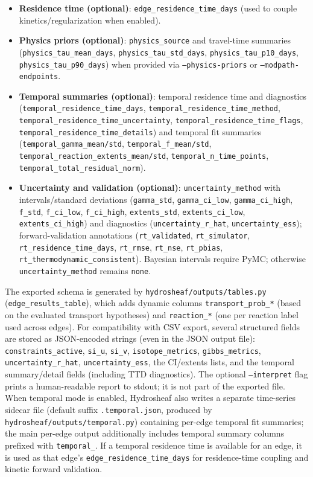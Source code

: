\documentclass[12pt,a4paper]{article}
\theoremstyle{plain}
\theoremstyle{definition}
\theoremstyle{remark}
\begin{document}
\begin{itemize}
	\item \textbf{Residence time (optional)}: \texttt{edge\_residence\_time\_days} (used to couple kinetics/regularization when enabled).
	\item \textbf{Physics priors (optional)}: \texttt{physics\_source} and travel-time summaries (\texttt{physics\_tau\_mean\_days}, \texttt{physics\_tau\_std\_days}, \texttt{physics\_tau\_p10\_days}, \texttt{physics\_tau\_p90\_days}) when provided via \texttt{--physics-priors} or \texttt{--modpath-endpoints}.
	\item \textbf{Temporal summaries (optional)}: temporal residence time and diagnostics (\texttt{temporal\_residence\_time\_days}, \texttt{temporal\_residence\_time\_method}, \texttt{temporal\_residence\_time\_uncertainty}, \texttt{temporal\_residence\_time\_flags}, \texttt{temporal\_residence\_time\_details}) and temporal fit summaries (\texttt{temporal\_gamma\_mean/std}, \texttt{temporal\_f\_mean/std}, \texttt{temporal\_reaction\_extents\_mean/std}, \texttt{temporal\_n\_time\_points}, \texttt{temporal\_total\_residual\_norm}).
	\item \textbf{Uncertainty and validation (optional)}: \texttt{uncertainty\_method} with intervals/standard deviations (\texttt{gamma\_std}, \texttt{gamma\_ci\_low}, \texttt{gamma\_ci\_high}, \texttt{f\_std}, \texttt{f\_ci\_low}, \texttt{f\_ci\_high}, \texttt{extents\_std}, \texttt{extents\_ci\_low}, \texttt{extents\_ci\_high}) and diagnostics (\texttt{uncertainty\_r\_hat}, \texttt{uncertainty\_ess}); forward-validation annotations (\texttt{rt\_validated}, \texttt{rt\_simulator}, \texttt{rt\_residence\_time\_days}, \texttt{rt\_rmse}, \texttt{rt\_nse}, \texttt{rt\_pbias}, \texttt{rt\_thermodynamic\_consistent}). Bayesian intervals require PyMC; otherwise \texttt{uncertainty\_method} remains \texttt{none}.

\end{itemize}

The exported schema is generated by \texttt{hydrosheaf/outputs/tables.py} (\texttt{edge\_results\_table}), which adds dynamic columns \texttt{transport\_prob\_*} (based on the evaluated transport hypotheses) and \texttt{reaction\_*} (one per reaction label used across edges). For compatibility with CSV export, several structured fields are stored as JSON-encoded strings (even in the JSON output file): \texttt{constraints\_active}, \texttt{si\_u}, \texttt{si\_v}, \texttt{isotope\_metrics}, \texttt{gibbs\_metrics}, \texttt{uncertainty\_r\_hat}, \texttt{uncertainty\_ess}, the CI/extents lists, and the temporal summary/detail fields (including TTD diagnostics). The optional \texttt{--interpret} flag prints a human-readable report to stdout; it is not part of the exported file. When temporal mode is enabled, Hydrosheaf also writes a separate time-series sidecar file (default suffix \texttt{.temporal.json}, produced by \texttt{hydrosheaf/outputs/temporal.py}) containing per-edge temporal fit summaries; the main per-edge output additionally includes temporal summary columns prefixed with \texttt{temporal\_}. If a temporal residence time is available for an edge, it is used as that edge's \texttt{edge\_residence\_time\_days} for residence-time coupling and kinetic forward validation.
\end{document}
